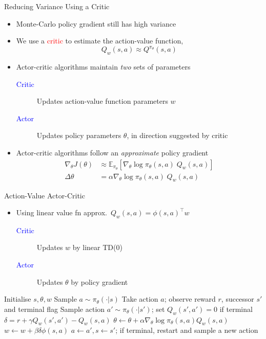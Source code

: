 \begin{frame}{Reducing Variance Using a Critic}
\begin{itemize}
  \item Monte-Carlo policy gradient still has high variance
  \item We use a \textcolor{red}{critic} to estimate the action-value function,
  \[ Q_w(s, a) \approx Q^{\pi_\theta}(s, a) \]
  \item Actor-critic algorithms maintain \emph{two} sets of parameters
  \begin{description}
    \item[\textcolor{blue}{Critic}] Updates action-value function parameters $w$
    \item[\textcolor{blue}{Actor}] Updates policy parameters $\theta$, in direction suggested by critic
  \end{description}
  \item Actor-critic algorithms follow an \emph{approximate} policy gradient
  \begin{align*}
  \nabla_\theta J(\theta) &\approx \mathbb{E}_{\pi_\theta}[\nabla_\theta \log \pi_\theta(s, a)\; Q_w(s, a)]\\
  \Delta\theta &= \alpha \nabla_\theta \log \pi_\theta(s, a)\; Q_w(s, a)
  \end{align*}
\end{itemize}
\end{frame}

\begin{frame}{Action-Value Actor-Critic}
\small
\begin{itemize}
  \item Using linear value fn approx.\ $Q_w(s, a) = \phi(s, a)^\top w$
  \begin{description}
    \item[\textcolor{blue}{Critic}] Updates $w$ by linear TD(0)
    \item[\textcolor{blue}{Actor}] Updates $\theta$ by policy gradient
  \end{description}
\end{itemize}
\small
\begin{algorithmic}
  \State Initialise $s, \theta, w$
  \State Sample $a \sim \pi_\theta(\cdot|s)$
    \State Take action $a$; observe reward $r$, successor $s'$ and terminal flag
    \State Sample action $a' \sim \pi_\theta(\cdot|s')$; set $Q_w(s',a')=0$ if terminal
    \State $\delta = r + \gamma Q_w(s', a') - Q_w(s, a)$
    \State $\theta \leftarrow \theta + \alpha \nabla_\theta \log \pi_\theta(s, a) Q_w(s, a)$
    \State $w \leftarrow w + \beta \delta \phi(s, a)$
    \State $a \leftarrow a', s \leftarrow s'$; if terminal, restart and sample a new action
  \EndFor
\EndFunction
\end{algorithmic}
\end{frame}

